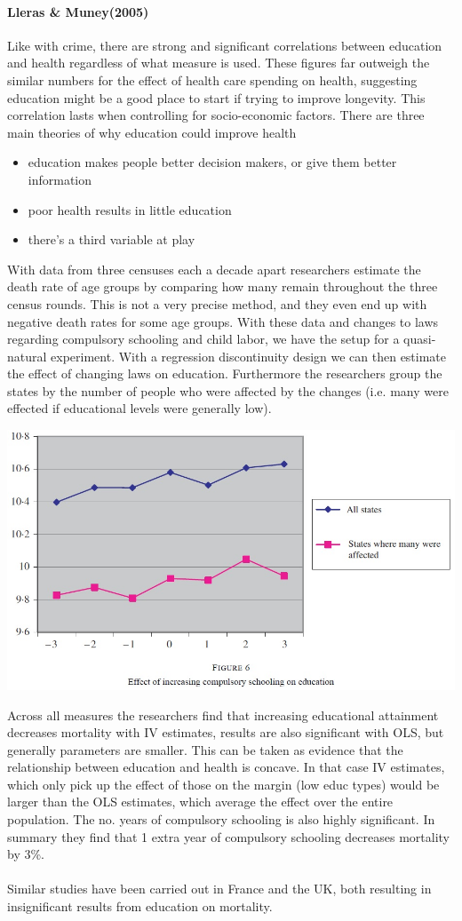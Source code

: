 \documentclass[12pt, a4paper]{article}
\begin{document}
\begin{multicols}{2}
\paragraph{Lleras \& Muney(2005)} Like with crime, there are strong and significant correlations between education and health regardless of what measure is used. These figures far outweigh the similar numbers for the effect of health care spending on health, suggesting education might be a good place to start if trying to improve longevity. This correlation lasts when controlling for socio-economic factors. There are three main theories of why education could improve health
\begin{itemize}
\item education makes people better decision makers, or give them better information
\item poor health results in little education
\item there's a third variable at play
\end{itemize}
With data from three censuses each a decade apart researchers estimate the death rate of age groups by comparing how many remain throughout the three census rounds. This is not a very precise method, and they even end up with negative death rates for some age groups. With these data and changes to laws regarding compulsory schooling and child labor, we have the setup for a quasi-natural experiment. With a regression discontinuity design we can then estimate the effect of changing laws on education. Furthermore the researchers group the states by the number of people who were affected by the changes (i.e. many were effected if educational levels were generally low).

\includegraphics[width = 0.4 \textwidth]{compsch.jpg}

Across all measures the researchers find that increasing educational attainment decreases mortality with IV estimates, results are also significant with OLS, but generally parameters are smaller. This can be taken as evidence that the relationship between education and health is concave. In that case IV estimates, which only pick up the effect of those on the margin (low educ types) would be larger than the OLS estimates, which average the effect over the entire population. The no. years of compulsory schooling is also highly significant. In summary they find that 1 extra year of compulsory schooling decreases mortality by 3\%.
\\ \\
Similar studies have been carried out in France and the UK, both resulting in insignificant results from education on mortality.


\end{multicols}
\end{document}
